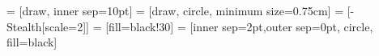 \usepackage[utf8]{inputenc}
\usepackage[T1]{fontenc}
\usepackage{tikz}

\usepackage{algorithm}
\usepackage{algpseudocode}

\usetikzlibrary{arrows.meta}
\usetikzlibrary{shapes.multipart}
\usetikzlibrary{patterns}

 = [draw, inner sep=10pt]
 = [draw, circle, minimum size=0.75cm]
 = [-{Stealth[scale=2]}]
 = [fill=black!30]
 = [inner sep=2pt,outer sep=0pt, circle, fill=black]

\newcommand{\intset}[1]{[\![{#1}]\!]}

\newcommand{\pair}[2]{\langle{#1},{#2}\rangle}

\renewcommand{\thealgorithm}{}

\makeatletter
\newcommand{\incircbin}{\mathpalette\@incircbin}
\newcommand\@incircbin[2]{\mathbin{\ooalign{\hidewidth$#1#2$\hidewidth\crcr$#1\bigcirc$}}}
